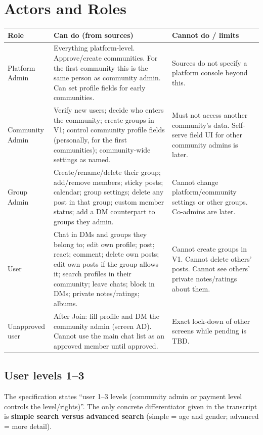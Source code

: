 \documentclass[11pt,a4paper]{article}
\begin{document}
\section{Actors and Roles}

\begin{tabularx}{\textwidth}{@{}l Y Y@{}}
\toprule
\textbf{Role} & \textbf{Can do (from sources)} & \textbf{Cannot do / limits} \\
\midrule
Platform Admin
  & Everything platform-level. Approve/create communities. For the first community this is the same person as community admin. Can set profile fields for early communities.
  & Sources do not specify a platform console beyond this. \\
Community Admin
  & Verify new users; decide who enters the community; create groups in V1; control community profile fields (personally, for the first communities); community-wide settings as named.
  & Must not access another community's data. Self-serve field UI for other community admins is later. \\
Group Admin
  & Create/rename/delete their group; add/remove members; sticky posts; calendar; group settings; delete any post in that group; custom member status; add a DM counterpart to groups they admin.
  & Cannot change platform/community settings or other groups. Co-admins are later. \\
User
  & Chat in DMs and groups they belong to; edit own profile; post; react; comment; delete own posts; edit own posts if the group allows it; search profiles in their community; leave chats; block in DMs; private notes/ratings; albums.
  & Cannot create groups in V1. Cannot delete others' posts. Cannot see others' private notes/ratings about them. \\
Unapproved user
  & After Join: fill profile and DM the community admin (screen AD). Cannot use the main chat list as an approved member until approved.
  & Exact lock-down of other screens while pending is TBD. \\
\bottomrule
\end{tabularx}

\subsection{User levels 1--3}
The specification states ``user 1--3 levels (community admin or payment level controls the level/rights)''. The only concrete differentiator given in the transcript is \textbf{simple search versus advanced search} (simple = age and gender; advanced = more detail).
\end{document}
